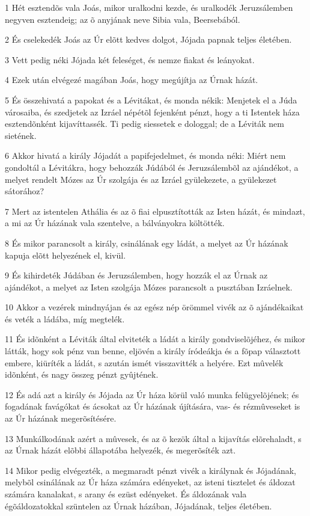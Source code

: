 \par 1 Hét esztendõs vala Joás, mikor uralkodni kezde, és uralkodék Jeruzsálemben negyven esztendeig; az õ anyjának neve Sibia vala, Beersebából.
\par 2 És cselekedék Joás az Úr elõtt kedves dolgot, Jójada papnak teljes életében.
\par 3 Vett pedig néki Jójada két feleséget, és nemze fiakat és leányokat.
\par 4 Ezek után elvégezé magában Joás, hogy megújítja az Úrnak házát.
\par 5 És összehivatá a papokat és a Lévitákat, és monda nékik: Menjetek el a Júda városaiba, és szedjetek az Izráel népétõl fejenként pénzt, hogy a ti Istentek háza esztendõnként kijavíttassék. Ti pedig siessetek e dologgal; de a Léviták nem sietének.
\par 6 Akkor hivatá a király Jójadát a papifejedelmet, és monda néki: Miért nem gondoltál a Lévitákra, hogy behozzák Júdából és Jeruzsálembõl az ajándékot, a melyet rendelt Mózes az Úr szolgája és az Izráel gyülekezete, a gyülekezet sátorához?
\par 7 Mert az istentelen Athália és az õ fiai elpusztították az Isten házát, és mindazt, a mi az Úr házának vala szentelve, a bálványokra költötték.
\par 8 És mikor parancsolt a király, csinálának egy ládát, a melyet az Úr házának kapuja elõtt helyezének el, kivül.
\par 9 És kihirdeték Júdában és Jeruzsálemben, hogy hozzák el az Úrnak az ajándékot, a melyet az Isten szolgája Mózes parancsolt a pusztában Izráelnek.
\par 10 Akkor a vezérek mindnyájan és az egész nép örömmel vivék az õ ajándékaikat és veték a ládába, míg megtelék.
\par 11 És idõnként a Léviták által elviteték a ládát a király gondviselõjéhez, és mikor látták, hogy sok pénz van benne, eljövén a király íródeákja és a fõpap választott embere, kiüríték a ládát, s azután ismét visszavitték a helyére. Ezt mûvelék idõnként, és nagy összeg pénzt gyûjtének.
\par 12 És adá azt a király és Jójada az Úr háza körül való munka felügyelõjének; és fogadának favágókat és ácsokat az Úr házának újítására, vas- és rézmûveseket is az Úr házának megerõsítésére.
\par 13 Munkálkodának azért a mûvesek, és az õ kezök által a kijavítás elõrehaladt, s az Úrnak házát elõbbi állapotába helyezék, és megerõsíték azt.
\par 14 Mikor pedig elvégezték, a megmaradt pénzt vivék a királynak és Jójadának, melybõl csinálának az Úr háza számára edényeket, az isteni tisztelet és áldozat számára kanalakat, s arany és ezüst edényeket. És áldozának vala égõáldozatokkal szüntelen az Úrnak házában, Jójadának, teljes életében.
